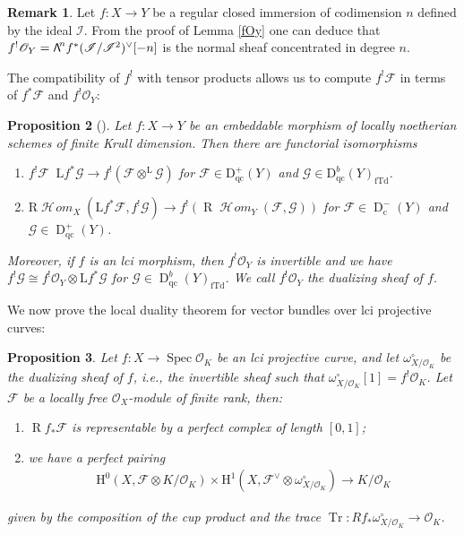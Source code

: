 \documentclass[11pt]{article}
\newcommand{\ie}{i.e.,\xspace}
\newcommand\bw[1]{\mathbin{\hbox{$\mathsf{\Lambda}$}^{\!#1}}}
\newcommand{\rc}{\mathrm{c}}
\newcommand{\qc}{\mathrm{qc}}
\newcommand{\fTd}{\mathrm{fTd}}
\numberwithin{equation}{section}
\newtheorem{prop}{Proposition}[section]
\theoremstyle{definition}
\newtheorem{remark}[prop]{Remark}
\newcommand{\n}[1]{\mathcal{#1}}
\newcommand{\s}[1]{\mathscr{#1}}
\DeclareMathOperator{\Tr}{Tr}
\DeclareMathOperator{\R}{R}
\DeclareMathOperator{\D}{D}
\DeclareMathOperator{\dotimes}{\otimes^{\mathrm{L}}}
\DeclareMathOperator{\Spec}{Spec}
\DeclareMathOperator{\sHom}{\s{H}\!\mathit{om}}
\begin{document}
\begin{remark}
Let $f:X\to Y$ be a regular closed immersion of codimension $n$ defined by the ideal $\s{I}$. From the proof of Lemma \ref{fOy} one can deduce that $f^!\s{O}_Y=\bw{n} f^*(\s{I}/\s{I}^2)^{\vee}[-n]$ is the normal sheaf concentrated in degree $n$.
\end{remark}

The compatibility of $f^!$ with tensor products allows us to compute $f^!\s{F}$ in terms of $f^*\n{F}$ and $f^!\s{O}_Y$:

\begin{prop}[{\cite[Prop.\,III.8.8]{hartshorne1966residues}}]
\label{dualizingAndTensor}
Let $f:X\to Y$ be an embeddable morphism of locally noetherian schemes of finite Krull dimension. Then there are functorial isomorphisms
\begin{enumerate}

\item $f^!\n{F}\dotimes \mathrm{L}f^*\n{G}\to f^!(\n{F}\otimes^{\mathrm{L}} \n{G})$ for $\n{F}\in \mathrm{D}_{\qc}^+(Y)$ and $\n{G}\in \mathrm{D}^b_{\qc}(Y)_{\fTd}$.

\item $\mathrm{R} \sHom_X(\mathrm{L}f^*\n{F}, f^! \n{G})\!\to\!f^!(\R \sHom_{Y}(\n{F}, \n{G}))$ for $\n{F}\!\in\!\D^-_{\rc}(Y)$ and $\n{G}\!\in\!\D^+_{\qc}(Y)$.
\end{enumerate}

Moreover, if $f$ is an lci morphism, then $f^!\s{O}_Y$ is invertible and we have $f^!\n{G}\cong f^!\s{O}_Y\otimes \mathrm{L}f^* \n{G}$ for $\n{G}\in \D^{b}_{\qc}(Y)_{\fTd}$. We call $f^! \s{O}_Y$ the dualizing sheaf of $f$.
\end{prop}

We now prove the local duality theorem for vector bundles over lci projective curves:

\begin{prop}
\label{LocalDualityCurves}
Let $f: X\to \Spec \n{O}_K$ be an lci projective curve, and let $\omega_{X/\n{O}_K}^\circ$ be the dualizing sheaf of $f$, \ie the invertible sheaf such that $\omega_{X/\n{O}_K}^\circ[1]=f^!\n{O}_K$. Let~$\n{F}$ be a locally free $\s{O}_X$-module of finite rank, then:
\begin{enumerate}

\item $\R f_*\n{F}$ is representable by a perfect complex of length $[0,1]$;

\item we have a perfect pairing
\begin{align*}
\mathrm{H}^0(X,\n{F}\otimes K/\n{O}_K)\times \mathrm{H}^1(X, \n{F}^\vee\otimes \omega_{X/\n{O}_K}^\circ)\to K/\n{O}_K
\end{align*}
\end{enumerate}
given by the composition of the cup product and the trace $\Tr: Rf_* \omega^{\circ}_{X/\n{O}_K}\to \n{O}_K$.
\end{prop}
\end{document}
